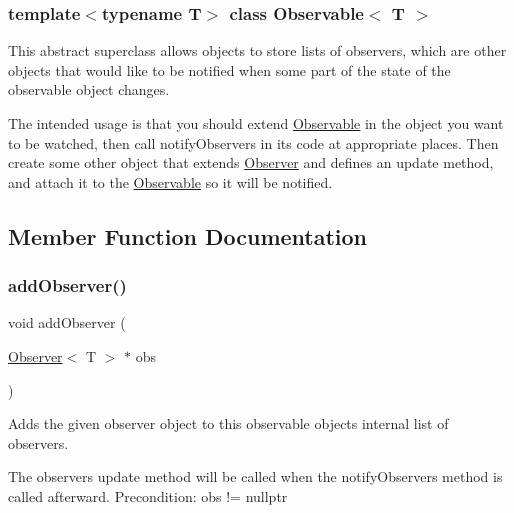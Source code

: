 \subsubsection*{template$<$typename T$>$\newline
class Observable$<$ T $>$}

This abstract superclass allows objects to store lists of observers, which are other objects that would like to be notified when some part of the state of the observable object changes. 

The intended usage is that you should extend \mbox{\hyperlink{classObservable}{Observable}} in the object you want to be watched, then call notify\+Observers in its code at appropriate places. Then create some other object that extends \mbox{\hyperlink{classObserver}{Observer}} and defines an update method, and attach it to the \mbox{\hyperlink{classObservable}{Observable}} so it will be notified. 

\subsection{Member Function Documentation}
\mbox{\label{classObservable_a7fa6df797eb4680c2776371f2937a1b2}} 
\subsubsection{\texorpdfstring{add\+Observer()}{addObserver()}\hspace{0.1cm}{\footnotesize\ttfamily [1/2]}}
{\footnotesize\ttfamily void add\+Observer (\begin{DoxyParamCaption}\item[{\mbox{\hyperlink{classObserver}{Observer}}$<$ T $>$ $\ast$}]{obs }\end{DoxyParamCaption})}



Adds the given observer object to this observable object\textquotesingle{}s internal list of observers. 

The observer\textquotesingle{}s update method will be called when the notify\+Observers method is called afterward. Precondition\+: obs != nullptr \mbox{\label{classObservable_a49fbc8dd9a3300429f7f575dc7ba0be8}} 
